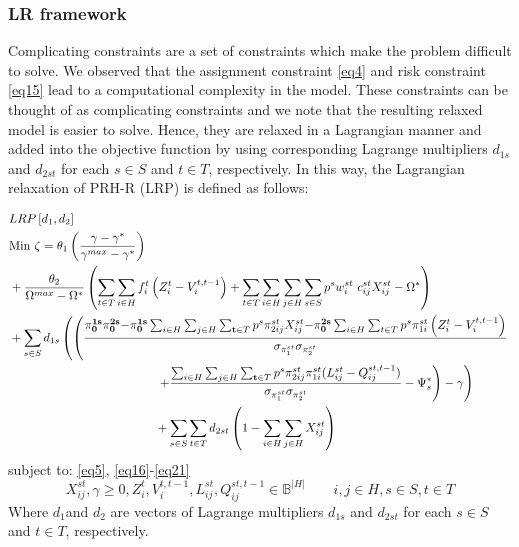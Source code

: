 \documentclass[review]{elsarticle}
\begin{document}
\subsubsection{LR framework}

Complicating constraints are a set of constraints which make the problem difficult to solve. We observed that the assignment constraint \eqref{eq4} and risk constraint \eqref{eq15} lead to a computational complexity in the model. These constraints can be thought of as complicating constraints and we note that the resulting relaxed model is easier to solve. Hence, they are relaxed in a Lagrangian manner and added into the objective function by using corresponding Lagrange multipliers $d_{1s}$ and $d_{2st}$ for each $s\in S$ and $t\in T$, respectively. In this way, the Lagrangian relaxation of PRH-R (LRP) is defined as follows:

\begin{align}
&LRP\left[d_1,d_2\right]\nonumber\\
&{\rm Min}\ \zeta ={\theta }_1\left(\frac{\gamma -{\gamma }^*}{{\gamma }^{max}-{\gamma }^*}\right)\nonumber\\
&+\frac{\theta_2 }{{\Omega }^{max}-{\Omega }^*} \left({\sum_{t\in T}{\sum_{i\in H}{f^t_i\left(Z^t_i-V^{t,t-1}_i\right)}}+\sum_{t\in T}{\sum_{i\in H}{\sum_{j\in H}{\sum_{s\in S}{p^sw^{st}_i{\ c}^{st}_{ij}X^{st}_{ij}}}}}-{\Omega }^*}\right)\label{eq31}\\
&+\sum_{s\in S}d_{1s}\left(\left(\frac{{{\mathbf{ \pi }}^{\mathbf{ 1}
\mathbf{ s}}_{\mathbf{ 0}}{\mathbf{ \pi }}^{\mathbf{ 2}
\mathbf{ s}}_{\mathbf{ 0}}\mathbf{ -}{\mathbf{ \pi }}^{\mathbf{ 1}
\mathbf{ s}}_{\mathbf{ 0}}\sum_{i\in H}{\sum_{j\in H}{\sum_{\mathbf{ t}\in T}{p^s{\pi }^{st}_{2ij}X^{st}_{ij}}}}\mathbf{ -}{\mathbf{ \pi }}^{\mathbf{ 2}\mathbf{ s}}_{\mathbf{ 0}}\sum_{i\in H}{\sum_{t\in T}{p^s{\pi }^{st}_{1i}\left(Z^t_i-V^{t,t-1}_i\right)}}}}{{\sigma }_{{\pi }^{st}_{1}}{\sigma }_{{\pi }^{st}_{2}}}\right.\right.\nonumber\\
&\qquad\qquad\qquad\qquad\qquad\qquad  \left.\left.+\frac{\sum_{i\in H}{\sum_{j\in H}{\sum_{\mathbf{ t}\in T}{p^s{\pi }^{st}_{2ij}{\pi }^{st}_{1i}(L^{st}_{ij}-Q^{st,t-1}_{ij})}}}}{{\sigma }_{{\pi }^{st}_{1}}{\sigma }_{{\pi }^{st}_{2}}}-{\Psi }^*_s\right)-\gamma \right) \nonumber \\
&\qquad\qquad\qquad\qquad\qquad\qquad  +\sum_{s\in S}\sum_{t\in T}d_{2st}\left(1-\sum_{i\in H}\sum_{j\in H}X^{st}_{ij} \right)\nonumber
\end{align}
subject to: \eqref{eq5}, \eqref{eq16}-\eqref{eq21}
\[ 
X^{st}_{ij},\gamma \geq 0, Z^t_i, V^{t,t-1}_i, L^{st}_{ij}, Q^{st,t-1}_{ij}\in {\mathbb{ B}}^{\left|H\right|}\qquad i,j\in H, s\in S, t\in T\]
Where $d_1$and $d_2$ are vectors of Lagrange multipliers $d_{1s}$ and $d_{2st}$ for each $s\in S$ and $t\in T$, respectively.
\end{document}
